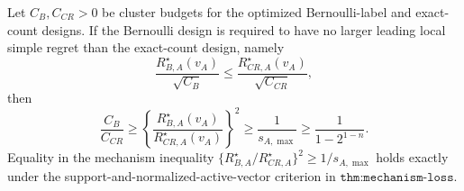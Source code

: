 Let \(C_B,C_{CR}>0\) be cluster budgets for the optimized Bernoulli-label and exact-count designs.  If the Bernoulli design is required to have no larger leading local simple regret than the exact-count design, namely
\[
\frac{R_{B,A}^\star(v_A)}{\sqrt{C_B}}
\leq
\frac{R_{CR,A}^\star(v_A)}{\sqrt{C_{CR}}},
\]
then
\[
\frac{C_B}{C_{CR}}
\geq
\left\{\frac{R_{B,A}^\star(v_A)}{R_{CR,A}^\star(v_A)}\right\}^{2}
\geq\frac1{s_{A,\max}}
\geq\frac1{1-2^{1-n}}.
\]
Equality in the mechanism inequality \(\{R_{B,A}^\star/R_{CR,A}^\star\}^2\geq1/s_{A,\max}\) holds exactly under the support-and-normalized-active-vector criterion in \(\texttt{thm:mechanism-loss}\).